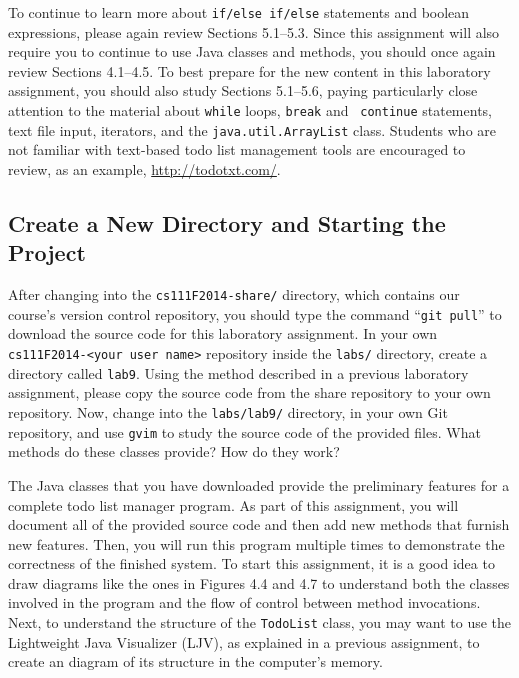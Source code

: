 To continue to learn more about {\tt if/else if/else} statements and boolean expressions, please again review Sections
5.1--5.3. Since this assignment will also require you to continue to use Java classes and methods, you should once again
review Sections 4.1--4.5.  To best prepare for the new content in this laboratory assignment, you should also study
Sections 5.1--5.6, paying particularly close attention to the material about {\tt while} loops, {\tt break} and {\tt
  continue} statements, text file input, iterators, and the {\tt java.util.ArrayList} class. Students who are not
familiar with text-based todo list management tools are encouraged to review, as an example, \url{http://todotxt.com/}.

\vspace{-0.1in}
\subsection*{Create a New Directory and Starting the Project}
\vspace{-0.05in}

After changing into the {\tt cs111F2014-share/} directory, which contains our course's version control repository, you
should type the command ``{\tt git pull}'' to download the source code for this laboratory assignment.  In your own {\tt
  cs111F2014-<your user name>} repository inside the {\tt labs/} directory, create a directory called {\tt lab9}. Using
the method described in a previous laboratory assignment, please copy the source code from the share repository to your
own repository. Now, change into the {\tt labs/lab9/} directory, in your own Git repository, and use {\tt gvim} to study
the source code of the provided files. What methods do these classes provide? How do they work? 

The Java classes that you have downloaded provide the preliminary features for a complete todo list manager program. As
part of this assignment, you will document all of the provided source code and then add new methods that furnish new
features.  Then, you will run this program multiple times to demonstrate the correctness of the finished system. To
start this assignment, it is a good idea to draw diagrams like the ones in Figures 4.4 and 4.7 to understand both the
classes involved in the program and the flow of control between method invocations. Next, to understand the structure of
the {\tt TodoList} class, you may want to use the Lightweight Java Visualizer (LJV), as explained in a previous
assignment, to create an diagram of its structure in the computer's memory.

